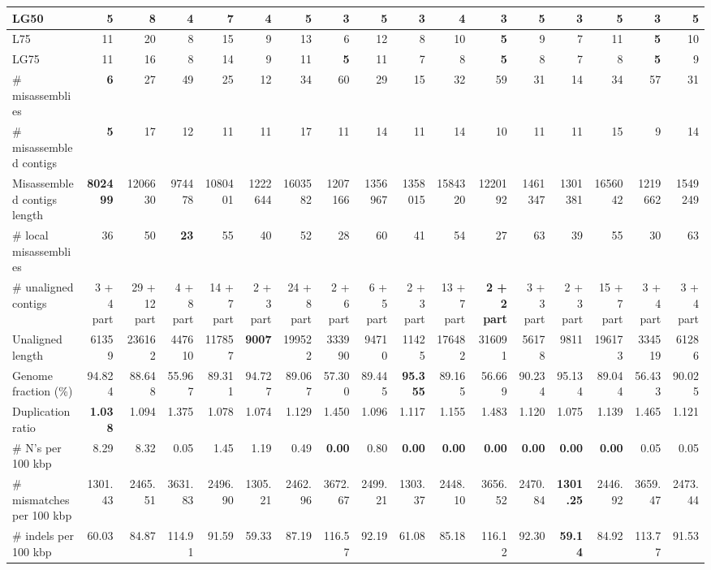 \documentclass[12pt,a4paper]{article}
\begin{document}
\begin{table}[ht]
\begin{center}
\begin{tabular}{|l*{16}{|r}|}
LG50 & 5 & 8 & 4 & 7 & 4 & 5 & {\bf 3} & 5 & {\bf 3} & 4 & {\bf 3} & 5 & {\bf 3} & 5 & {\bf 3} & 5 \\ \hline
L75 & 11 & 20 & 8 & 15 & 9 & 13 & 6 & 12 & 8 & 10 & {\bf 5} & 9 & 7 & 11 & {\bf 5} & 10 \\ \hline
LG75 & 11 & 16 & 8 & 14 & 9 & 11 & {\bf 5} & 11 & 7 & 8 & {\bf 5} & 8 & 7 & 8 & {\bf 5} & 9 \\ \hline
\# misassemblies & {\bf 6} & 27 & 49 & 25 & 12 & 34 & 60 & 29 & 15 & 32 & 59 & 31 & 14 & 34 & 57 & 31 \\ \hline
\# misassembled contigs & {\bf 5} & 17 & 12 & 11 & 11 & 17 & 11 & 14 & 11 & 14 & 10 & 11 & 11 & 15 & 9 & 14 \\ \hline
Misassembled contigs length & {\bf 802499} & 1206630 & 974478 & 1080401 & 1222644 & 1603582 & 1207166 & 1356967 & 1358015 & 1584320 & 1220192 & 1461347 & 1301381 & 1656042 & 1219662 & 1549249 \\ \hline
\# local misassemblies & 36 & 50 & {\bf 23} & 55 & 40 & 52 & 28 & 60 & 41 & 54 & 27 & 63 & 39 & 55 & 30 & 63 \\ \hline
\# unaligned contigs & 3 + 4 part & 29 + 12 part & 4 + 8 part & 14 + 7 part & 2 + 3 part & 24 + 8 part & 2 + 6 part & 6 + 5 part & 2 + 3 part & 13 + 7 part & {\bf 2 + 2 part} & 3 + 3 part & 2 + 3 part & 15 + 7 part & 3 + 4 part & 3 + 4 part \\ \hline
Unaligned length & 61359 & 236162 & 447610 & 117857 & {\bf 9007} & 199522 & 333990 & 94710 & 11425 & 176482 & 316091 & 56178 & 9811 & 196173 & 334519 & 61286 \\ \hline
Genome fraction (\%) & 94.824 & 88.648 & 55.967 & 89.311 & 94.727 & 89.067 & 57.300 & 89.445 & {\bf 95.355} & 89.165 & 56.669 & 90.234 & 95.134 & 89.044 & 56.433 & 90.025 \\ \hline
Duplication ratio & {\bf 1.038} & 1.094 & 1.375 & 1.078 & 1.074 & 1.129 & 1.450 & 1.096 & 1.117 & 1.155 & 1.483 & 1.120 & 1.075 & 1.139 & 1.465 & 1.121 \\ \hline
\# N's per 100 kbp & 8.29 & 8.32 & 0.05 & 1.45 & 1.19 & 0.49 & {\bf 0.00} & 0.80 & {\bf 0.00} & {\bf 0.00} & {\bf 0.00} & {\bf 0.00} & {\bf 0.00} & {\bf 0.00} & 0.05 & 0.05 \\ \hline
\# mismatches per 100 kbp & 1301.43 & 2465.51 & 3631.83 & 2496.90 & 1305.21 & 2462.96 & 3672.67 & 2499.21 & 1303.37 & 2448.10 & 3656.52 & 2470.84 & {\bf 1301.25} & 2446.92 & 3659.47 & 2473.44 \\ \hline
\# indels per 100 kbp & 60.03 & 84.87 & 114.91 & 91.59 & 59.33 & 87.19 & 116.57 & 92.19 & 61.08 & 85.18 & 116.12 & 92.30 & {\bf 59.14} & 84.92 & 113.77 & 91.53 \\ \hline

\end{tabular}
\end{center}
\end{table}
\end{document}
